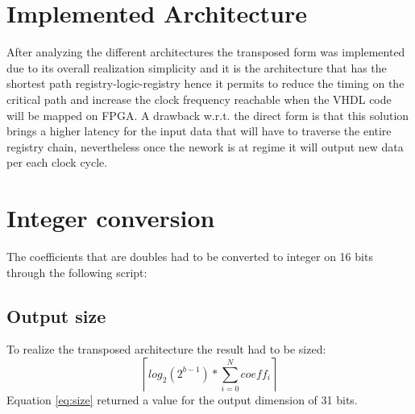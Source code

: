 \section{Implemented Architecture}
After analyzing the different architectures the transposed form was implemented due to its overall realization simplicity and it is the architecture that has the shortest path registry-logic-registry hence it permits to reduce the timing on the critical path and increase the clock frequency reachable when the VHDL code will be mapped on FPGA. A drawback w.r.t. the direct form is that this solution brings a higher latency for the input data that will have to traverse the entire registry chain, nevertheless once the nework is at regime it will output new data per each clock cycle.
\section{Integer conversion}
The coefficients that are doubles had to be converted to integer on 16 bits through the following script:

\subsection{Output size}
\label{sec:sizing}
To realize the transposed architecture the result had to be sized:
\begin{equation}
	\left \lceil log_2(2^{b-1})*\sum_{i=0}^{N} coeff_i\right \rceil	
	\label{eq:size}
\end{equation}
Equation \ref{eq:size} returned a value for the output dimension of 31 bits.
